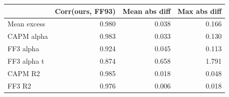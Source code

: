 \begin{tabular}{lrrr}
\toprule
 & Corr(ours, FF93) & Mean abs diff & Max abs diff \\
\midrule
Mean excess & 0.980 & 0.038 & 0.166 \\
CAPM alpha & 0.983 & 0.033 & 0.130 \\
FF3 alpha & 0.924 & 0.045 & 0.113 \\
FF3 alpha t & 0.874 & 0.658 & 1.791 \\
CAPM R2 & 0.985 & 0.018 & 0.048 \\
FF3 R2 & 0.976 & 0.006 & 0.018 \\
\bottomrule
\end{tabular}
